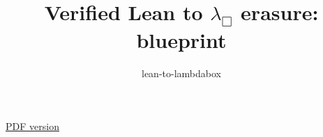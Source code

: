 \documentclass{report}
\title{Verified Lean to \texorpdfstring{$\lambda_\Box$}{lambda-box} erasure: blueprint}
\author{lean-to-lambdabox}
\begin{document}
\maketitle
\begin{center}
\href{blueprint.pdf}{PDF version}
\end{center}

\end{document}
